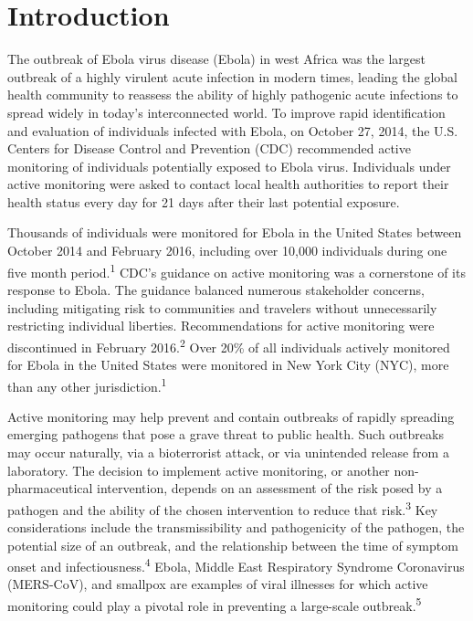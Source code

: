\documentclass[]{article}
\begin{document}
\section{Introduction}\label{introduction}

The outbreak of Ebola virus disease (Ebola) in west Africa was the
largest outbreak of a highly virulent acute infection in modern times,
leading the global health community to reassess the ability of highly
pathogenic acute infections to spread widely in today's interconnected
world. To improve rapid identification and evaluation of individuals
infected with Ebola, on October 27, 2014, the U.S. Centers for Disease
Control and Prevention (CDC) recommended active monitoring of
individuals potentially exposed to Ebola virus. Individuals under active
monitoring were asked to contact local health authorities to report
their health status every day for 21 days after their last potential
exposure.

Thousands of individuals were monitored for Ebola in the United States
between October 2014 and February 2016, including over 10,000
individuals during one five month period.\textsuperscript{1} CDC's
guidance on active monitoring was a cornerstone of its response to
Ebola. The guidance balanced numerous stakeholder concerns, including
mitigating risk to communities and travelers without unnecessarily
restricting individual liberties. Recommendations for active monitoring
were discontinued in February 2016.\textsuperscript{2} Over 20\% of all
individuals actively monitored for Ebola in the United States were
monitored in New York City (NYC), more than any other
jurisdiction.\textsuperscript{1}

Active monitoring may help prevent and contain outbreaks of rapidly
spreading emerging pathogens that pose a grave threat to public health.
Such outbreaks may occur naturally, via a bioterrorist attack, or via
unintended release from a laboratory. The decision to implement active
monitoring, or another non-pharmaceutical intervention, depends on an
assessment of the risk posed by a pathogen and the ability of the chosen
intervention to reduce that risk.\textsuperscript{3} Key considerations
include the transmissibility and pathogenicity of the pathogen, the
potential size of an outbreak, and the relationship between the time of
symptom onset and infectiousness.\textsuperscript{4} Ebola, Middle East
Respiratory Syndrome Coronavirus (MERS-CoV), and smallpox are examples
of viral illnesses for which active monitoring could play a pivotal role
in preventing a large-scale outbreak.\textsuperscript{5}
\end{document}
